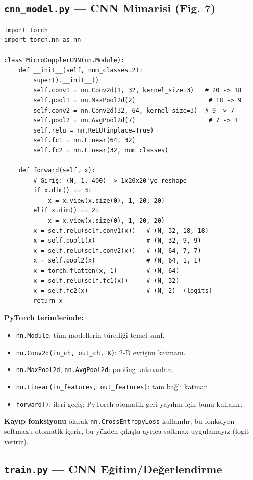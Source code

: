 \documentclass[11pt,a4paper]{article}
\begin{document}
\subsection{\texttt{cnn\_model.py} — CNN Mimarisi (Fig. 7)}
\begin{lstlisting}[caption={Paper Fig. 7 — iki conv + iki pool + iki FC}]
import torch
import torch.nn as nn

class MicroDopplerCNN(nn.Module):
    def __init__(self, num_classes=2):
        super().__init__()
        self.conv1 = nn.Conv2d(1, 32, kernel_size=3)   # 20 -> 18
        self.pool1 = nn.MaxPool2d(2)                    # 18 -> 9
        self.conv2 = nn.Conv2d(32, 64, kernel_size=3)  # 9 -> 7
        self.pool2 = nn.AvgPool2d(7)                    # 7 -> 1
        self.relu = nn.ReLU(inplace=True)
        self.fc1 = nn.Linear(64, 32)
        self.fc2 = nn.Linear(32, num_classes)

    def forward(self, x):
        # Giriş: (N, 1, 400) -> 1x20x20'ye reshape
        if x.dim() == 3:
            x = x.view(x.size(0), 1, 20, 20)
        elif x.dim() == 2:
            x = x.view(x.size(0), 1, 20, 20)
        x = self.relu(self.conv1(x))   # (N, 32, 18, 18)
        x = self.pool1(x)              # (N, 32, 9, 9)
        x = self.relu(self.conv2(x))   # (N, 64, 7, 7)
        x = self.pool2(x)              # (N, 64, 1, 1)
        x = torch.flatten(x, 1)        # (N, 64)
        x = self.relu(self.fc1(x))     # (N, 32)
        x = self.fc2(x)                # (N, 2)  (logits)
        return x
\end{lstlisting}
\textbf{PyTorch terimlerinde:}
\begin{itemize}
    \item \texttt{nn.Module}: tüm modellerin türediği temel sınıf.
    \item \texttt{nn.Conv2d(in\_ch, out\_ch, K)}: 2-D evrişim katmanı.
    \item \texttt{nn.MaxPool2d}, \texttt{nn.AvgPool2d}: pooling katmanları.
    \item \texttt{nn.Linear(in\_features, out\_features)}: tam bağlı katman.
    \item \texttt{forward()}: ileri geçiş; PyTorch otomatik geri yayılım için bunu kullanır.
\end{itemize}
\textbf{Kayıp fonksiyonu} olarak \texttt{nn.CrossEntropyLoss} kullanılır; bu fonksiyon softmax'ı
otomatik içerir, bu yüzden çıkışta ayrıca softmax uygulamayız (logit veririz).

\subsection{\texttt{train.py} — CNN Eğitim/Değerlendirme}
\end{document}
